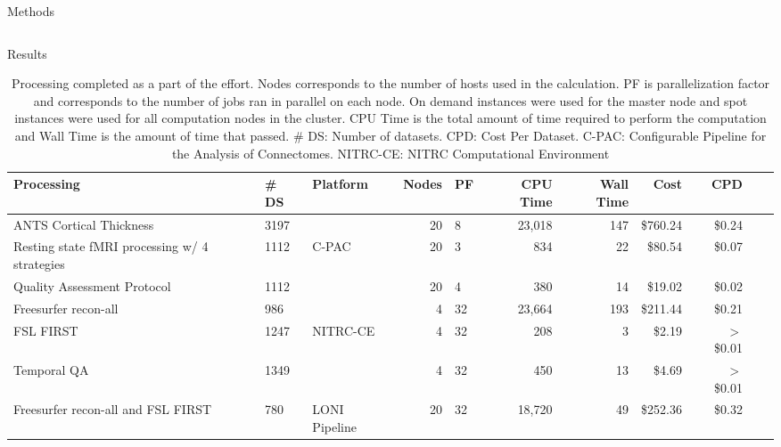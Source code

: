 \documentclass[final,hyperref={pdfpagelabels=false}]{beamer}
\begin{document}
\begin{frame}
\begin{columns}
\begin{column}{.5\textwidth}
{\begin{block}{Methods}
\begin{column}{.5\textwidth}
				
            \end{column}
        \vfill
        \end{block}
        \begin{block}{Results}
            \begin{center}
                \begin{table}
                    \caption{Processing completed as a part of the effort. Nodes corresponds to the number of hosts used in the calculation. PF is parallelization factor and corresponds to the number of jobs ran in parallel on each node. On demand instances were used for the master node and spot instances were used for all computation nodes in the cluster. CPU Time is the total amount of time required to perform the computation and Wall Time is the amount of time that passed. \# DS: Number of datasets. CPD: Cost Per Dataset. C-PAC: Configurable Pipeline for the Analysis of Connectomes. NITRC-CE: NITRC Computational Environment}
                    \begin{tabularx}{\textwidth}{XXlrl*{6}{r}}
                        {\bf Processing} & {\bf \# DS} & {\bf Platform} & {\bf Nodes} & {\bf PF} & {\bf CPU Time} & {\bf Wall Time} & {\bf Cost} & {\bf CPD}\\
                        \hline
                        ANTS Cortical Thickness & 3197 &  & 20 & 8 & 23,018 & 147 & \$760.24 & \$0.24\\
                        Resting state fMRI processing w/ 4 strategies & 1112 & C-PAC  & 20 & 3 & 834 & 22 & \$80.54 & \$0.07\\
                        Quality Assessment Protocol & 1112 & & 20 & 4 & 380 & 14 & \$19.02 & \$0.02\\
                        \hline
                        Freesurfer recon-all & 986 &  & 4 & 32 & 23,664 & 193 & \$211.44 & \$0.21\\
                        FSL FIRST & 1247 & NITRC-CE & 4 & 32 & 208 & 3 & \$2.19 & $>$ \$0.01\\
                        Temporal QA & 1349 &  & 4 & 32 & 450 & 13 & \$4.69 & $>$ \$0.01\\
                        \hline
                        Freesurfer recon-all and FSL FIRST & 780 & LONI Pipeline & 20 & 32 & 18,720 & 49 & \$252.36 & \$0.32\\
                    \end{tabularx}
                \end{table}
            \end{center}

\end{block}}
\end{column}
\end{columns}
\end{frame}
\end{document}
